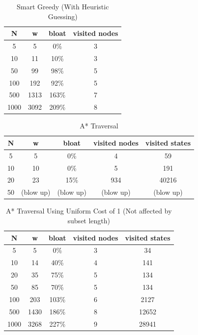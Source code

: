 \begin{table}
    \centering
    \begin{tabular}{|c|c|c|c|}
        \hline
        N & w & bloat & visited nodes \\
        \hline
        5 & 5 & 0\% & 3 \\
        10 & 11 & 10\% & 3 \\
        50 & 99 & 98\% & 5 \\
        100 & 192 & 92\% & 5 \\
        500 & 1313 & 163\% & 7 \\
        1000 & 3092 & 209\% & 8 \\
        \hline
    \end{tabular}
    \caption{Smart Greedy (With Heuristic Guessing)}
    \label{tab:smartgreedy}
\end{table}

\begin{table}
    \centering
    \begin{tabular}{|c|c|c|c|c|}
        \hline
        N & w & bloat & visited nodes & visited states \\
        \hline
        5 & 5 & 0\% & 4 & 59 \\
        10 & 10 & 0\% & 5 & 191 \\
        20 & 23 & 15\% & 934 & 40216 \\
        50 & (blow up) & (blow up) & (blow up) & (blow up) \\
        \hline
    \end{tabular}
    \caption{A* Traversal}
    \label{tab:astar}
\end{table}

\begin{table}
    \centering
    \begin{tabular}{|c|c|c|c|c|}
        \hline
        N & w & bloat & visited nodes & visited states \\
        \hline
        5 & 5 & 0\% & 3 & 34 \\
        10 & 14 & 40\% & 4 & 141 \\
        20 & 35 & 75\% & 5 & 134 \\
        50 & 85 & 70\% & 5 & 134 \\
        100 & 203 & 103\% & 6 & 2127 \\
        500 & 1430 & 186\% & 8 & 12652 \\
        1000 & 3268 & 227\% & 9 & 28941 \\
        \hline
    \end{tabular}
    \caption{A* Traversal Using Uniform Cost of 1 (Not affected by subset length)}
    \label{tab:astaruniform}
\end{table}

